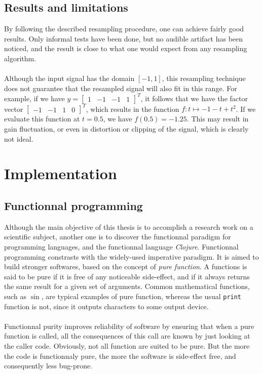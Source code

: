 \documentclass[letterpaper]{article}
\newcommand*{\codeinl}{\texttt}
\theoremstyle{definition}
\theoremstyle{remark}
\theoremstyle{plain}
\begin{document}
\subsection{Results and limitations}
By following the described resampling procedure, one can achieve fairly good
results. Only informal tests have been done, but no audible artifact has been
noticed, and the result is close to what one would expect from any resampling
algorithm.

\paragraph{}
Although the input signal has the domain \([-1,1]\), this resampling technique
does not guarantee that the resampled signal will also fit in this range. For
example, if we have
\(y=\begin{bmatrix}1&-1&-1&1\end{bmatrix}^T\), it follows
that we have the factor vector
\(\begin{bmatrix}-1&-1&1&0\end{bmatrix}^T\), which results
in the function \(f:t\mapsto -1-t+t^2\). If we evaluate this function at
\(t=0.5\), we have \(f(0.5)=-1.25\).  This may result in gain fluctuation, or
even in distortion or clipping of the signal, which is clearly not ideal.

\section{Implementation}

\subsection{Functionnal programming}
Although the main objective of this thesis is to accomplish a research work on a
scientific subject, another one is to discover the functionnal paradigm for
programming languages, and the functionnal language \emph{Clojure}. Functionnal
programming constrasts with the widely-used imperative paradigm. It is aimed to
build stronger softwares, based on the concept of \emph{pure function}. A
functions is said to be pure if it is free of any noticeable side-effect, and if
it always returns the same result for a given set of arguments. Common
mathematical functions, such as \(\sin\), are typical examples of pure function,
whereas the usual \codeinl{print} function is not, since it outputs characters
to some output device.

\paragraph{}
Functionnal purity improves reliability of software by ensuring that when a pure
function is called, all the consequences of this call are known by just looking
at the caller code. Obviously, not all function are suited to be pure. But the
more the code is functionnaly pure, the more the software is side-effect free,
and consequently less bug-prone.
\end{document}
